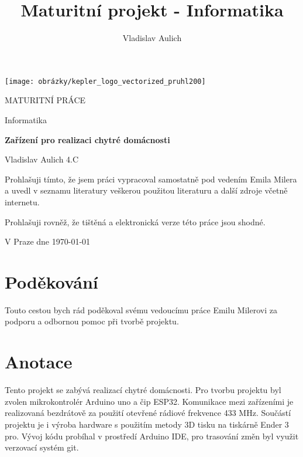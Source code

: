 \documentclass[a4paper,titlepage]{article}
\title{Maturitní projekt - Informatika}
\author{Vladislav Aulich}
\begin{document}
\pagestyle{empty}
\begin{center}
	\begin{center}
		\texttt{[image: obrázky/kepler\_logo\_vectorized\_pruhl200]}
	\end{center}
	
	\huge{MATURITNÍ PRÁCE
		\vspace{0.5 cm}
		
		Informatika
		
		\vspace{2.5 cm}
		\textbf{Zařízení pro realizaci chytré domácnosti} }  
\end{center} 

\vspace{2.5 cm}
\Large{
	Vladislav Aulich 4.C
	
	\clearpage  
	
\vspace*{12 cm}

Prohlašuji tímto, že jsem  práci vypracoval samostatně pod vedením Emila Milera a uvedl v seznamu literatury veškerou použitou literaturu a další zdroje včetně internetu.

Prohlašuji rovněž, že tištěná a elektronická verze této práce jsou shodné.

V Praze dne \today            

\hspace{6.5cm} \makebox[2in]{\hrulefill}

\hspace{6.5cm}     


\clearpage
\section*{Poděkování}

Touto cestou bych rád poděkoval svému vedoucímu práce Emilu Milerovi za podporu a odbornou pomoc při tvorbě projektu.
\clearpage

\section*{Anotace}

Tento projekt se zabývá realizací chytré domácnosti. Pro tvorbu projektu byl zvolen mikrokontrolér Arduino uno a čip ESP32. Komunikace mezi zařízeními je realizovaná bezdrátově za použití otevřené rádiové frekvence 433 MHz. Součástí projektu je i výroba hardware s použitím metody 3D tisku na tiskárně Ender 3 pro. Vývoj kódu probíhal v prostředí Arduino IDE, pro trasování změn byl využit verzovací systém git.

}
\end{document}
